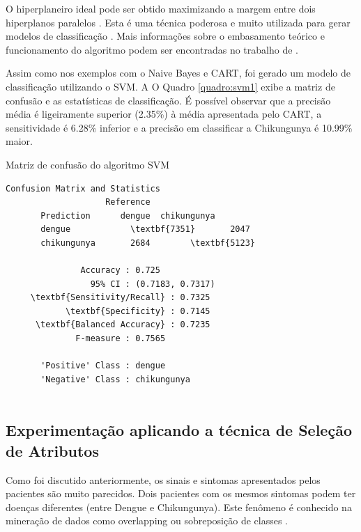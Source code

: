 O hiperplaneiro ideal pode ser obtido maximizando a margem entre dois hiperplanos paralelos \cite{qi2013robust}. Esta é uma técnica  poderosa e muito utilizada para gerar modelos de classificação \cite{Meyer2017}. Mais informações sobre o embasamento teórico e funcionamento do algoritmo podem ser encontradas no trabalho de .

Assim como nos exemplos com o Naive Bayes e CART, foi gerado um modelo de classificação utilizando o SVM. A O Quadro \ref{quadro:svm1} exibe a matriz de confusão e as estatísticas de classificação. É possível observar que a precisão média é ligeiramente superior (2.35\%) à média apresentada pelo CART, a sensitividade é 6.28\% inferior e a precisão em classificar a Chikungunya é 10.99\% maior.

\begin{quadro}
\caption{\label{quadro:svm1}Matriz de confusão do algoritmo SVM}
\begingroup
    \fontsize{10pt}{9pt}\selectfont
    \begin{Verbatim}[commandchars=\\\{\}]
      Confusion Matrix and Statistics
                    Reference
       Prediction      dengue  chikungunya
       dengue            \textbf{7351}       2047
       chikungunya       2684        \textbf{5123}
                                         
               Accuracy : 0.725         
                 95% CI : (0.7183, 0.7317) 
     \textbf{Sensitivity/Recall} : 0.7325         
            \textbf{Specificity} : 0.7145         
      \textbf{Balanced Accuracy} : 0.7235
              F-measure : 0.7565        
         
       'Positive' Class : dengue 
       'Negative' Class : chikungunya
  
    \end{Verbatim}  
\endgroup
{}
\end{quadro}


\subsection{Experimentação aplicando a técnica de Seleção de Atributos}

Como foi discutido anteriormente, os sinais e sintomas apresentados pelos pacientes são muito parecidos. Dois pacientes com os mesmos sintomas podem ter doenças diferentes (entre Dengue e Chikungunya). Este fenômeno é conhecido na mineração de dados como overlapping ou sobreposição de classes \cite{xiong2010classification}.

